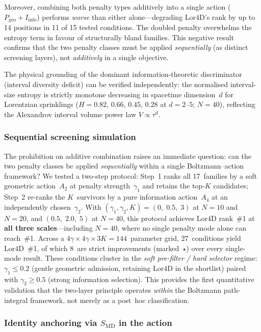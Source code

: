 \documentclass[12pt,a4paper]{article}
\newcommand{\SMD}{S_{\mathrm{MD}}}
\newcommand{\Lor}{\mathrm{Lor4D}}
\begin{document}
Moreover, combining both penalty types additively into a single action
($P_{\mathrm{geo}} + I_{\mathrm{info}}$) performs \emph{worse} than either
alone---degrading $\Lor$'s rank by up to 14 positions in 11 of 15 tested
conditions. The doubled penalty overwhelms the entropy term in favour of
structurally bland families. This negative result confirms that the two penalty
classes must be applied \emph{sequentially} (as distinct screening layers), not
\emph{additively} in a single objective.

The physical grounding of the dominant information-theoretic discriminator
(interval diversity deficit) can be verified independently: the normalised
interval-size entropy is strictly monotone decreasing in spacetime dimension~$d$
for Lorentzian sprinklings ($H = 0.82$, $0.66$, $0.45$, $0.28$ at $d = 2$--$5$;
$N = 40$), reflecting the Alexandrov interval volume power law
$V \propto \tau^d$.

\subsubsection{Sequential screening simulation}

The prohibition on additive combination raises an immediate question:
can the two penalty classes be applied \emph{sequentially} within a single
Boltzmann--action framework?
We tested a two-step protocol:
Step~1 ranks all 17~families by a soft geometric action~$A_2$ at penalty
strength~$\gamma_1$ and retains the top-$K$ candidates;
Step~2 re-ranks the $K$~survivors by a pure information action~$A_4$ at an
independently chosen~$\gamma_2$.
With $(\gamma_1,\gamma_2,K) = (0,\;0.5,\;3)$ at $N=10$ and $N=20$, and
$(0.5,\;2.0,\;5)$ at $N=40$, this protocol achieves $\Lor$ rank~\#1 at
\textbf{all three scales}---including $N=40$, where no single penalty mode
alone can reach~\#1.
Across a $4\gamma\times 4\gamma\times 3K = 144$~parameter grid,
27~conditions yield $\Lor$~\#1, of which 8~are strict improvements
(marked~$\star$) over every single-mode result.
These conditions cluster in the \emph{soft pre-filter / hard selector}
regime: $\gamma_1\leq 0.2$ (gentle geometric admission, retaining $\Lor$ in
the shortlist) paired with $\gamma_2\geq 0.5$ (strong information
selection).
This provides the first quantitative validation that the two-layer principle
operates \emph{within} the Boltzmann path-integral framework, not merely as
a post~hoc classification.

\subsubsection{Identity anchoring via \texorpdfstring{$\SMD$}{S\_MD}
  in the action}
\end{document}
